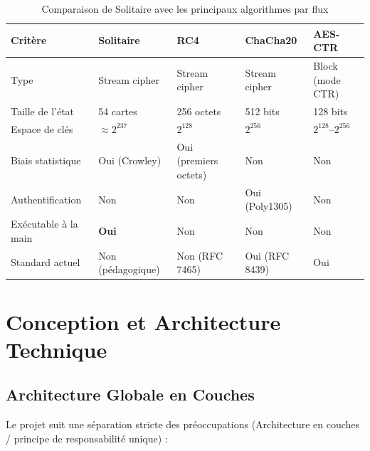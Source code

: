\documentclass[12pt,a4paper]{article}
\begin{document}
\begin{table}[H]
\centering
\caption{Comparaison de Solitaire avec les principaux algorithmes par flux}
\begin{tabularx}{\textwidth}{lXXXX}
\toprule
\textbf{Critère} & \textbf{Solitaire} & \textbf{RC4} & \textbf{ChaCha20} & \textbf{AES-CTR} \\
\midrule
Type & Stream cipher & Stream cipher & Stream cipher & Block (mode CTR) \\
Taille de l'état & 54 cartes & 256 octets & 512 bits & 128 bits \\
Espace de clés & $\approx 2^{237}$ & $2^{128}$ & $2^{256}$ & $2^{128}$--$2^{256}$ \\
Biais statistique & Oui (Crowley) & Oui (premiers octets) & Non & Non \\
Authentification & Non & Non & Oui (Poly1305) & Non \\
Exécutable à la main & \textbf{Oui} & Non & Non & Non \\
Standard actuel & Non (pédagogique) & Non (RFC 7465) & Oui (RFC 8439) & Oui \\
\bottomrule
\end{tabularx}
\label{tab:comparaison_ciphers}
\end{table}

\section{Conception et Architecture Technique}

\subsection{Architecture Globale en Couches}
Le projet suit une séparation stricte des préoccupations (Architecture en couches / principe de responsabilité unique) :
\end{document}
